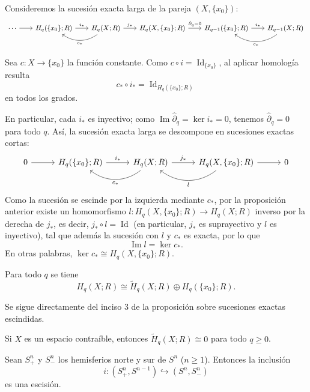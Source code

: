 \begin{dem}
Consideremos la sucesión exacta larga de la pareja $(X, \{x_0\})$:
\[
{\small
\begin{tikzcd}[column sep=1.9em]
\cdots \arrow[r]
& H_q(\{x_0\}; R) \arrow[r, "i_*"]
& H_q(X; R) \arrow[r, "j_*"] \arrow[l, bend left=36, "c_*"]
& H_q(X, \{x_0\}; R) \arrow[r, "\hat{\partial}_q = 0"]
& H_{q-1}(\{x_0\}; R) \arrow[r, "i_*"]
& H_{q-1}(X; R) \arrow[l, bend left=36, "c_*"]
\end{tikzcd}}
\]

Sea $c \colon X \to \{x_0\}$ la función constante. Como $c \circ i = \operatorname{Id}_{\{x_0\}}$, al aplicar homología resulta 
$$c_* \circ i_* = \operatorname{Id}_{H_q(\{x_0\}; R)}$$ 
en todos los grados.

En particular, cada $i_*$ es inyectivo; como $\operatorname{Im} \hat{\partial}_q = \ker i_* = 0$, tenemos $\hat{\partial}_q = 0$ para todo $q$. Así, la sucesión exacta larga se descompone en sucesiones exactas cortas:
\[
\begin{tikzcd}[column sep=2.8em]
0 \arrow[r]
& H_q(\{x_0\}; R) \arrow[r, "i_*"]
& H_q(X; R) \arrow[r, "j_*"] \arrow[l, bend left=38, "c_*"]
& H_q(X, \{x_0\}; R) \arrow[r] \arrow[l, bend left=38, "l"]
& 0
\end{tikzcd}
\]
Como la sucesión se escinde por la izquierda mediante $c_*$, por la proposición anterior existe un homomorfismo $l \colon H_q(X, \{x_0\}; R) \to H_q(X; R)$ inverso por la derecha de $j_*$, es decir, $j_* \circ l = \operatorname{Id}$ (en particular, $j_*$ es suprayectivo y $l$ es inyectivo), tal que además la sucesión con $l$ y $c_*$ es exacta, por lo que
\[
{\operatorname{Im} l}= {\ker c_*}.
\]
En otras palabras, $\ker c_* \cong H_q(X, \{x_0\}; R)$.
\end{dem}
\begin{corolario}
Para todo $q$ se tiene
\[
H_q(X; R) \cong \widetilde{H}_q(X; R) \oplus H_q(\{x_0\}; R).
\]
\end{corolario}

\begin{dem}
Se sigue directamente del inciso 3 de la proposición sobre sucesiones exactas escindidas.
\end{dem}

\begin{corolario}
Si $X$ es un espacio contraíble, entonces $\widetilde{H}_q(X; R) \cong 0$ para todo $q \geq 0$.
\end{corolario}

\begin{lema}
Sean $S_+^n$ y $S_-^n$ los hemisferios norte y sur de $S^n$ ($n \geq 1$). Entonces la inclusión
\[
i \colon (S_+^n, S^{n-1}) \hookrightarrow (S^n, S_-^n)
\]
es una escisión.
\end{lema}

